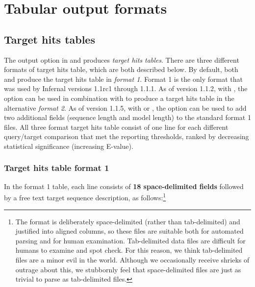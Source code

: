 \section{Tabular output formats}
\label{section:tabular}
\setcounter{footnote}{0}

\subsection{Target hits tables}

The  output option in  and
 produces \emph{target hits tables}. There are three
different formats of target hits table, which are both described
below. By default, both  and  produce the
target hits table in \emph{format 1}. Format 1 is the only format that
was used by Infernal versions 1.1rc1 through 1.1.1. As of version
1.1.2, with , the  option can be used in
combination with  to produce a target hits table in
the alternative \emph{format 2}.  As of version 1.1.5, with
 or , the  option can be
used to add two additional fields (sequence length and model length)
to the standard format 1 files.  All three format target hits table
consist of one line for each different query/target comparison that
met the reporting thresholds, ranked by decreasing statistical
significance (increasing E-value).

\subsubsection{Target hits table format 1}

In the format 1 table, each line
consists of \textbf{18 space-delimited fields} followed by a free text
target sequence description, as follows:\footnote{The 
  format is deliberately space-delimited (rather than tab-delimited)
  and justified into aligned columns, so these files are suitable both
  for automated parsing and for human examination. Tab-delimited data
  files are difficult for humans to examine and spot check. For this
  reason, we think tab-delimited files are a minor evil in the
  world. Although we occasionally receive shrieks of outrage about
  this, we stubbornly feel that space-delimited files are just as
  trivial to parse as tab-delimited files.}

